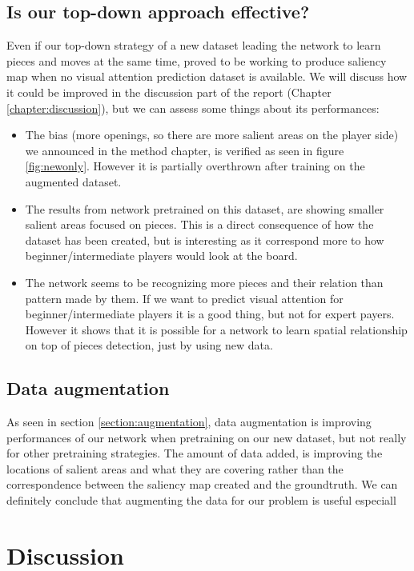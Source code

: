 \subsection{Is our top-down approach effective?}

Even if our top-down strategy of a new dataset leading the network to learn pieces and moves at the same time, proved to be working to produce saliency map when no visual attention prediction dataset is available. We will discuss how it could be improved in the discussion part of the report (Chapter \ref{chapter:discussion}), but we can assess some things about its performances:
\begin{itemize}
    \item The bias (more openings, so there are more salient areas on the player side) we announced in the method chapter, is verified as seen in figure \ref{fig:newonly}. However it is partially overthrown after training on the augmented dataset.
    \item The results from network pretrained on this dataset, are showing smaller salient areas focused on pieces. This is a direct consequence of how the dataset has been created, but is interesting as it correspond more to how beginner/intermediate players would look at the board.
    \item The network seems to be recognizing more pieces and their relation than pattern made by them. If we want to predict visual attention for beginner/intermediate players it is a good thing, but not for expert payers. However it shows that it is possible for a network to learn spatial relationship on top of pieces detection, just by using new data.
\end{itemize}

\subsection{Data augmentation}

As seen in section \ref{section:augmentation}, data augmentation is improving performances of our network when pretraining on our new dataset, but not really for other pretraining strategies. The amount of data added, is improving the locations of salient areas and what they are covering rather than the correspondence between the saliency map created and the groundtruth. We can definitely conclude that augmenting the data for our problem is useful especiall


\section{Discussion}

